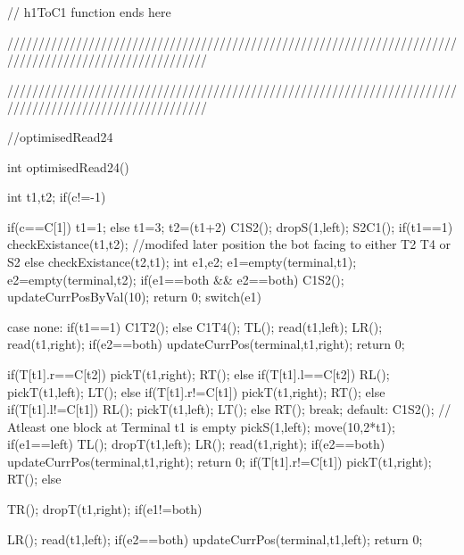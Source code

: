 // h1ToC1 function ends here

////////////////////////////////////////////////////////////////////////////////////////////////////////






////////////////////////////////////////////////////////////////////////////////////////////////////////

//optimisedRead24 

int optimisedRead24()
{
    int t1,t2;
    if(c!=-1)
    {
        if(c==C[1])
        {
            t1=1;
        }
        else
        {
            t1=3;
        }
        t2=(t1+2)%
        C1S2();
        dropS(1,left);
        S2C1();
        if(t1==1)
            checkExistance(t1,t2); //modifed later position the bot facing to either T2 T4 or S2
        else
            checkExistance(t2,t1);
        int e1,e2;
        e1=empty(terminal,t1);
        e2=empty(terminal,t2);
        if(e1==both && e2==both)
        {
            C1S2();
            updateCurrPosByVal(10);
            return 0;
        }
        switch(e1)
        {
            case none:
            	if(t1==1)
				{
					C1T2();
				}
				else
				{
					C1T4();
				}
                TL();
                read(t1,left);
                LR();
                read(t1,right);
                if(e2==both)
				{
					updateCurrPos(terminal,t1,right);
					return 0;
				}
                

                if(T[t1].r==C[t2])
                {
                    pickT(t1,right);
                    RT();
                }
                else if(T[t1].l==C[t2])
                {
                    RL();
                    pickT(t1,left);
                    LT();
                }
                else if(T[t1].r!=C[t1])
                {
                    pickT(t1,right);
                    RT();
                }
                else if(T[t1].l!=C[t1])
                {
                    RL();
                    pickT(t1,left);
                    LT();
                }
                else
                {
                    RT();
                }
                break;
            default:
                C1S2();  // Atleast one block at Terminal t1 is empty
                pickS(1,left);
                move(10,2*t1);
                if(e1==left)
                {
                    TL();
                    dropT(t1,left);
                    LR();
                    read(t1,right);
                    if(e2==both)
                    {
	                    updateCurrPos(terminal,t1,right);
	                    return 0;
                    }
					if(T[t1].r!=C[t1])
                    {
                        pickT(t1,right);
                    }
                    RT();
                }
                else
                {
                    TR();
                    dropT(t1,right);
                    if(e1!=both)
                    {
                        LR();
                        read(t1,left);
                        if(e2==both)
						{
							updateCurrPos(terminal,t1,left);
							return 0;
						}
						
}}}}}

